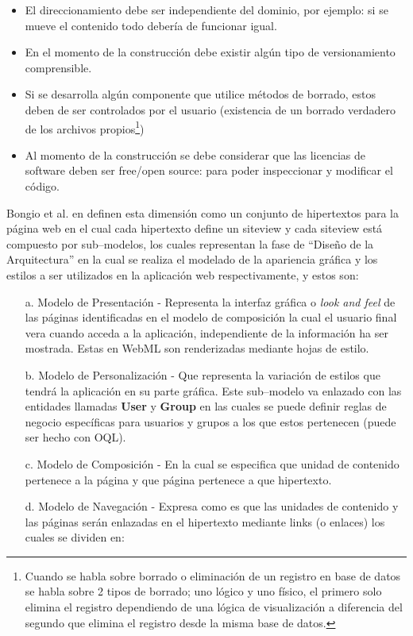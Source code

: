 \documentclass[oneside,12pt,a4paper]{memoir}%
\begin{document}
\begin{itemize}
\begin{itemize}
		  \item El direccionamiento debe ser independiente del dominio, por ejemplo:
		  si se mueve el contenido todo deber\'ia de funcionar igual.
		  \item En el momento de la construcci\'on debe existir alg\'un
		  tipo de versionamiento comprensible.
		  \item Si se desarrolla alg\'un componente que utilice m\'etodos de borrado,
		  estos deben de ser controlados por el usuario (existencia de un borrado
		  verdadero de los archivos propios\footnote{Cuando se habla sobre
		  borrado o eliminaci\'on de un registro en base de datos se habla
		  sobre 2 tipos de borrado; uno l\'ogico y uno f\'isico, el primero
		  solo elimina el registro dependiendo de una l\'ogica de
		  visualizaci\'on a diferencia del segundo que elimina el registro desde la
		  misma base de datos.})
		  \item Al momento de la construcci\'on se debe considerar que las licencias de
		  software deben ser free/open source: para poder inspeccionar y modificar el
		  c\'odigo.
		\end{itemize}
		
		Bongio et al. en \cite{Ceri2000} definen esta dimensi\'on como un conjunto de
		hipertextos para la p\'agina web en el cual cada hipertexto define un siteview y cada siteview est\'a
		compuesto por sub--modelos, los cuales representan la fase de
		``Dise\~no de la Arquitectura'' en la cual se realiza el modelado de la
		apariencia gr\'afica y los estilos a ser utilizados en la aplicaci\'on web
		respectivamente, y estos son:
		
		\begin{itemize}
		  \item [a.] Modelo de Presentaci\'on - Representa la interfaz gr\'afica o
		  \textit{look and feel} de las p\'aginas identificadas en el modelo de
		  composici\'on la cual el usuario final vera cuando acceda a la aplicaci\'on, independiente de
		  la informaci\'on ha ser mostrada. Estas en \ac{WebML} son renderizadas
		  mediante hojas de estilo.
		  \item [b.] Modelo de Personalizaci\'on - Que representa la variaci\'on de
		  estilos que tendr\'a la aplicaci\'on en su parte gr\'afica. Este sub--modelo
		  va enlazado con las entidades llamadas \textbf{User} y \textbf{Group} en las
		  cuales se puede definir reglas de negocio espec\'ificas para usuarios y grupos a los que estos
		  pertenecen (puede ser hecho con \ac{OQL}).
		  \item [c.] Modelo de Composici\'on - En la cual se especifica que
		  unidad de contenido pertenece a la p\'agina y que p\'agina
		  pertenece a que hipertexto.
		  \item [d.] Modelo de Navegaci\'on - Expresa como es que las unidades
		  de contenido y las p\'aginas ser\'an enlazadas en el hipertexto
		  mediante links (o enlaces) los cuales se dividen en:
		  

\end{itemize}
\end{itemize}
\end{document}
